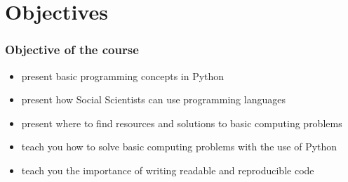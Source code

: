 \documentclass{beamer}
\begin{document}
\begin{frame}
{    }

\end{frame}

\section{Objectives}

\begin{frame}
    \frametitle{Objective of the course}
    \begin{itemize}
        \item present basic programming concepts in Python
        \item present how Social Scientists can use programming languages
        \item present where to find resources and solutions to basic computing problems
        \item teach you how to solve basic computing problems with the use of Python
        \item teach you the importance of writing readable and reproducible code
    \end{itemize}
\end{frame}
\end{document}
